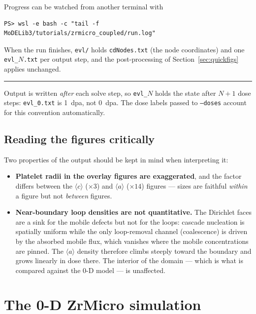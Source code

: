\documentclass[11pt]{article}
\newcommand{\aloop}{\ensuremath{\langle a\rangle}}
\newcommand{\cloop}{\ensuremath{\langle c\rangle}}
\newcommand{\ZrM}{\textsf{ZrMicro}}
\newcommand{\code}[1]{\texttt{\small #1}}
\newcommand{\file}[1]{\texttt{\footnotesize #1}}
\newenvironment{notebox}
  {\par\medskip\noindent
   \begin{minipage}{\textwidth}
   {\color{blue!50!black}\rule{\textwidth}{0.8pt}}\par\smallskip
   \small\noindent{\color{blue!50!black}\textbf{Note.}}\space}
  {\par\smallskip\noindent{\color{blue!50!black}\rule{\textwidth}{0.8pt}}
   \end{minipage}\par\medskip}
\begin{document}
Progress can be watched from another terminal with

\begin{lstlisting}[style=ps]
PS> wsl -e bash -c "tail -f MoDELib3/tutorials/zrmicro_coupled/run.log"
\end{lstlisting}

When the run finishes, \file{evl/} holds \file{cdNodes.txt} (the node
coordinates) and one \file{evl\_$N$.txt} per output step, and the
post-processing of Section~\ref{sec:quickfigs} applies unchanged.

\begin{notebox}
Output is written \emph{after} each solve step, so \file{evl\_$N$} holds the
state after $N{+}1$ dose steps: \file{evl\_0.txt} is 1~dpa, not 0~dpa. The
dose labels passed to \code{--doses} account for this convention
automatically.
\end{notebox}

\subsection{Reading the figures critically}

Two properties of the output should be kept in mind when interpreting it:

\begin{itemize}
\item \textbf{Platelet radii in the overlay figures are exaggerated}, and the
factor differs between the \cloop{} ($\times 3$) and \aloop{} ($\times 14$)
figures --- sizes are faithful \emph{within} a figure but not \emph{between}
figures.
\item \textbf{Near-boundary loop densities are not quantitative.} The
Dirichlet faces are a sink for the mobile defects but not for the loops:
cascade nucleation is spatially uniform while the only loop-removal channel
(coalescence) is driven by the absorbed mobile flux, which vanishes where the
mobile concentrations are pinned. The \aloop{} density therefore climbs
steeply toward the boundary and grows linearly in dose there. The interior
of the domain --- which is what is compared against the 0-D model --- is
unaffected.
\end{itemize}

\section{The 0-D \ZrM{} simulation}
\label{sec:zeroD}
\end{document}
